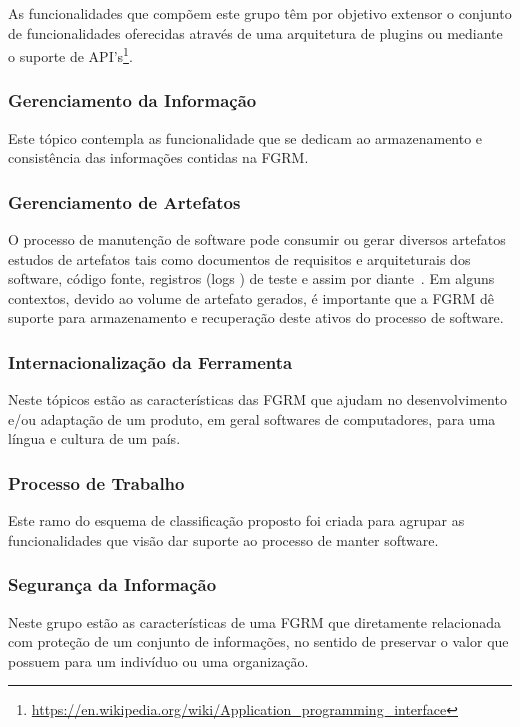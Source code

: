 As funcionalidades que compõem este grupo têm por objetivo extensor o conjunto
de funcionalidades oferecidas através de uma arquitetura de plugins ou mediante
o suporte de
API's\footnote{\url{https://en.wikipedia.org/wiki/Application_programming_interface}}.
\subsubsection{Gerenciamento da Informação}

Este tópico contempla as funcionalidade que se dedicam ao armazenamento e
consistência das informações contidas na FGRM.
\subsubsection{Gerenciamento de Artefatos}

O processo de manutenção de software pode consumir ou gerar diversos artefatos
estudos de artefatos tais como documentos de requisitos e arquiteturais dos
software, código fonte, registros (logs ) de teste e assim por
diante~\cite{cavalcanti2013bug}. Em alguns contextos, devido ao volume de
artefato gerados, é importante que a FGRM dê suporte para armazenamento e
recuperação deste ativos do processo de software.

\subsubsection{Internacionalização da Ferramenta}

Neste tópicos estão as características das FGRM que ajudam no desenvolvimento
e/ou adaptação de um produto, em geral softwares de computadores, para uma
língua e cultura de um país.

\subsubsection{Processo de Trabalho}
 Este ramo do esquema de classificação proposto foi criada para
 agrupar as funcionalidades que visão dar suporte ao processo de manter
 software.

\subsubsection{Segurança da Informação}

Neste grupo estão as características de uma FGRM que diretamente relacionada com
proteção de um conjunto de informações, no sentido de preservar o valor que
possuem para um indivíduo ou uma organização.

